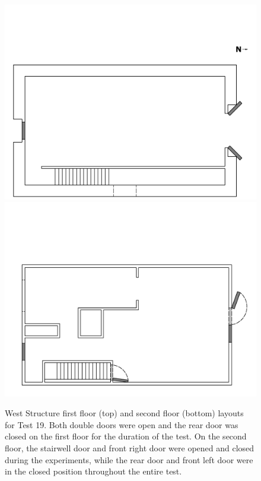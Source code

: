 \documentclass[12pt,oneside]{book}
\begin{document}
\clearpage

\begin{figure}[!ht]
\includegraphics[width=6in]{../../Drawings/PDFs/Without_Intrumentation/West_Structure_Hose_Test_19_1st_Floor}
\\
\includegraphics[width=6in]{../../Drawings/PDFs/Without_Intrumentation/West_Structure_Hose_Test_19_2nd_Floor}
\caption{West Structure first floor (top) and second floor (bottom) layouts for Test 19. Both double doors were open and the rear door was closed on the first floor for the duration of the test. On the second floor, the stairwell door and front right door were opened and closed during the experiments, while the rear door and front left door were in the closed position throughout the entire test.}
\label{fig:test_19_plan}
\end{figure}
\end{document}
